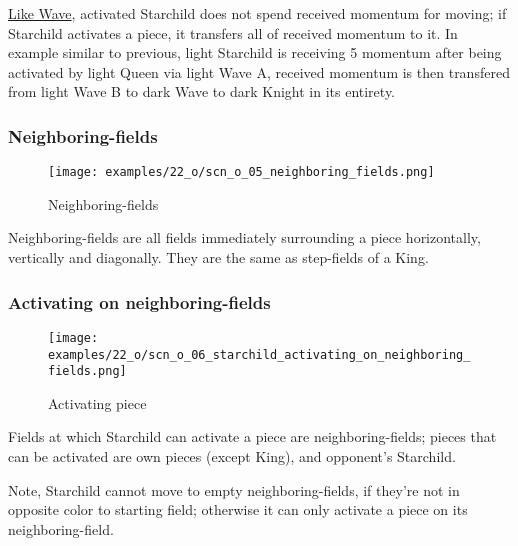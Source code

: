\hyperref[fig:10_wave]{Like Wave}, activated Starchild does not spend received momentum for moving;
if Starchild activates a piece, it transfers all of received momentum to it. In example similar to
previous, light Starchild is receiving 5 momentum after being activated by light Queen via light
Wave A, received momentum is then transfered from light Wave B to dark Wave to dark Knight in its
entirety.

\clearpage %

\subsubsection*{Neighboring-fields}

\noindent
\begin{wrapfigure}[5]{l}{0.4\textwidth}
\centering
\texttt{[image: examples/22\_o/scn\_o\_05\_neighboring\_fields.png]}
\caption{Neighboring-fields}
\label{fig:scn_o_05_neighboring_fields}
\end{wrapfigure}
Neighboring-fields are all fields immediately surrounding a piece horizontally, vertically
and diagonally. They are the same as step-fields of a King.

\vspace*{2.1\baselineskip}
\subsubsection*{Activating on neighboring-fields}

\noindent
\begin{wrapfigure}[7]{l}{0.4\textwidth}
\centering
\texttt{[image: examples/22\_o/scn\_o\_06\_starchild\_activating\_on\_neighboring\_fields.png]}
\caption{Activating piece}
\label{fig:scn_o_06_starchild_activating_on_neighboring_fields}
\end{wrapfigure}
Fields at which Starchild can activate a piece are neighboring-fields; pieces that can be
activated are own pieces (except King), and opponent's Starchild.

Note, Starchild cannot move to empty neighboring-fields, if they're not in opposite color to starting
field; otherwise it can only activate a piece on its neighboring-field.

